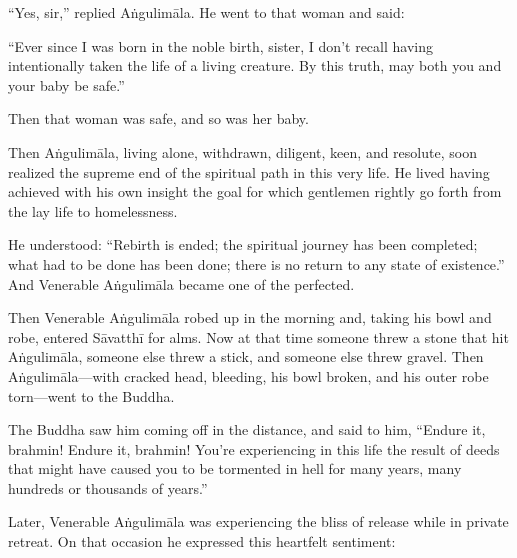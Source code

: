 \documentclass[12pt,openany]{book}%
\begin{document}
“Yes, sir,” replied \textsanskrit{Aṅgulimāla}. He went to that woman and said: 

“Ever since I was born in the noble birth, sister, I don’t recall having intentionally taken the life of a living creature. By this truth, may both you and your baby be safe.” 

Then that woman was safe, and so was her baby. 

Then \textsanskrit{Aṅgulimāla}, living alone, withdrawn, diligent, keen, and resolute, soon realized the supreme end of the spiritual path in this very life. He lived having achieved with his own insight the goal for which gentlemen rightly go forth from the lay life to homelessness. 

He understood: “Rebirth is ended; the spiritual journey has been completed; what had to be done has been done; there is no return to any state of existence.” And Venerable \textsanskrit{Aṅgulimāla} became one of the perfected. 

Then Venerable \textsanskrit{Aṅgulimāla} robed up in the morning and, taking his bowl and robe, entered \textsanskrit{Sāvatthī} for alms. Now at that time someone threw a stone that hit \textsanskrit{Aṅgulimāla}, someone else threw a stick, and someone else threw gravel. Then \textsanskrit{Aṅgulimāla}—with cracked head, bleeding, his bowl broken, and his outer robe torn—went to the Buddha. 

The Buddha saw him coming off in the distance, and said to him, “Endure it, brahmin! Endure it, brahmin! You’re experiencing in this life the result of deeds that might have caused you to be tormented in hell for many years, many hundreds or thousands of years.” 

Later, Venerable \textsanskrit{Aṅgulimāla} was experiencing the bliss of release while in private retreat. On that occasion he expressed this heartfelt sentiment: 
\end{document}
